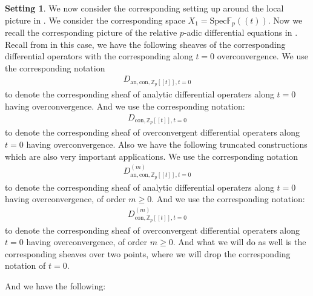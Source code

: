 \documentclass[11pt]{book}
\theoremstyle{definition}
\numberwithin{equation}{section}
\newtheorem{setting}[theorem]{Setting}
\begin{document}
\begin{setting}
\indent We now consider the corresponding setting up around the local picture in \cite{AM}. We consider the corresponding space $X_1=\mathrm{Spec}\mathbb{F}_p((t))$. Now we recall the corresponding picture of the relative $p$-adic differential equations in \cite{AM}. Recall from \cite[Section 2.1.2,2.1.3]{AM} in this case, we have the following sheaves of the corresponding differential operators with the corresponding along $t=0$ overconvergence. We use the corresponding notation
\begin{align}
D_{\mathrm{an},\mathrm{con},\mathbb{Z}_p[[t]],t=0}	
\end{align}
to denote the corresponding sheaf of analytic differential operaters along $t=0$ having overconvergence. And we use the corresponding notation:
\begin{align}
D_{\mathrm{con},\mathbb{Z}_p[[t]],t=0}	
\end{align}
to denote the corresponding sheaf of overconvergent differential operaters along $t=0$ having overconvergence. Also we have the following truncated constructions which are also very important applications. We use the corresponding notation
\begin{align}
D^{(m)}_{\mathrm{an},\mathrm{con},\mathbb{Z}_p[[t]],t=0}	
\end{align}
to denote the corresponding sheaf of analytic differential operaters along $t=0$ having overconvergence, of order $m\geq 0$. And we use the corresponding notation:
\begin{align}
D^{(m)}_{\mathrm{con},\mathbb{Z}_p[[t]],t=0}	
\end{align}
to denote the corresponding sheaf of overconvergent differential operaters along $t=0$ having overconvergence, of order $m\geq 0$. And what we will do as well is the corresponding sheaves over two points, where we will drop the corresponding notation of $t=0$.
\end{setting}


\indent And we have the following:
\end{document}
